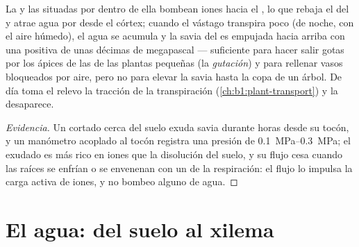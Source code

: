 \begin{proposition}\label{prop:b1:plant-water-minerals:rootpressure}
La  y las  situadas por dentro de ella bombean iones hacia
el , lo que rebaja el  del  y atrae agua por
 desde el córtex; cuando el vástago transpira poco (de noche, con el
aire húmedo), el agua se acumula y la savia del  es empujada hacia
arriba con una \emph{} positiva de unas décimas de
megapascal --- suficiente para hacer salir gotas por los ápices de las 
de las plantas pequeñas (la \emph{gutación}) y para rellenar vasos
bloqueados por aire, pero no para elevar la savia hasta la copa de un árbol.
De día toma el relevo la tracción de la transpiración
(\cref{ch:b1:plant-transport}) y la  desaparece.
\end{proposition}
\begin{proof}[Evidencia]
Un  cortado cerca del suelo exuda savia durante horas desde su tocón, y
un manómetro acoplado al tocón registra una presión de
\qtyrange{0.1}{0.3}{MPa}; el exudado es más rico en iones que la disolución
del suelo, y su flujo cesa cuando las raíces se enfrían o se envenenan con
un  de la respiración: el flujo lo impulsa la carga activa de
iones, y no bombeo alguno de agua.
\end{proof}

\section{El agua: del suelo al xilema}

